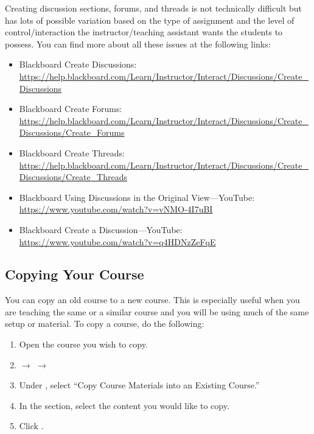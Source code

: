 Creating discussion sections, forums, and threads is not technically difficult but has lots of possible variation based on the type of assignment and the level of control/interaction the instructor/teaching assistant wants the students to possess. You can find more about all these issues at the following links:
	
	\begin{itemize}
	\item Blackboard Create Discussions: \url{https://help.blackboard.com/Learn/Instructor/Interact/Discussions/Create_Discussions}
	\item Blackboard Create Forums: \url{https://help.blackboard.com/Learn/Instructor/Interact/Discussions/Create_Discussions/Create_Forums}
	\item Blackboard Create Threads: \url{https://help.blackboard.com/Learn/Instructor/Interact/Discussions/Create_Discussions/Create_Threads}
	\item Blackboard Using Discussions in the Original View---YouTube: \url{https://www.youtube.com/watch?v=vNMO-4I7uBI}
	\item Blackboard Create a Discussion---YouTube: \url{https://www.youtube.com/watch?v=q4HDNzZeFqE}
	\end{itemize}



\subsection{Copying Your Course}

You can copy an old course to a new course. This is especially useful when you are teaching the same or a similar course and you will be using much of the same setup or material. To copy a course, do the following:
	
	\begin{enumerate}[1.]
	\item Open the course you wish to copy.
	\item {} $\to$  $\to$ 
	\item Under , select ``Copy Course Materials into an Existing Course.''
	\item In the  section, select the content you would like to copy.
	\item Click .
	\end{enumerate}
	
